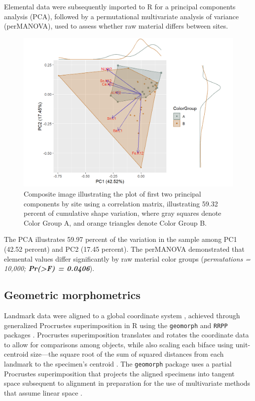 \documentclass[]{interact}
\theoremstyle{plain}%
\theoremstyle{definition}
\theoremstyle{remark}
\begin{document}
Elemental data were subsequently imported to R for a principal
components analysis (PCA), followed by a permutational multivariate
analysis of variance (perMANOVA), used to assess whether raw material
differs between sites.

\begin{figure}
\includegraphics[width=1\linewidth]{ms_files/figure-latex/pcaelem-1} \caption{Composite image illustrating the plot of first two principal components by site using a correlation matrix, illustrating 59.32 percent of cumulative shape variation, where gray squares denote Color Group A, and orange triangles denote Color Group B.}\label{fig:figsite}
\end{figure}

The PCA illustrates 59.97 percent of the variation in the sample among
PC1 (42.52 percent) and PC2 (17.45 percent). The perMANOVA demonstrated
that elemental values differ significantly by raw material color groups
(\emph{permutations = 10,000; \textbf{Pr(\textgreater F) = 0.0406}}).

\hypertarget{geometric-morphometrics}{%
\subsection{Geometric morphometrics}\label{geometric-morphometrics}}

Landmark data were aligned to a global coordinate system
\citep{RN8477, RN7502, RN11622, RN11623, RN11563}, achieved through
generalized Procrustes superimposition \citep{RN11138, RN478, RN1646} in
R using the \texttt{geomorph} and \texttt{RRPP} packages
\citep{RN1655, RN11775, RN11530, RN1774, RN9565}. Procrustes
superimposition translates and rotates the coordinate data to allow for
comparisons among objects, while also scaling each biface using
unit-centroid size---the square root of the sum of squared distances
from each landmark to the specimen's centroid
\citep{RN11139, RN11140, RN11564, RN478}. The \texttt{geomorph} package
uses a partial Procrustes superimposition that projects the aligned
specimens into tangent space subsequent to alignment in preparation for
the use of multivariate methods that assume linear space
\citep{RN11141, RN11142, RN1646, RN11563}.
\end{document}
